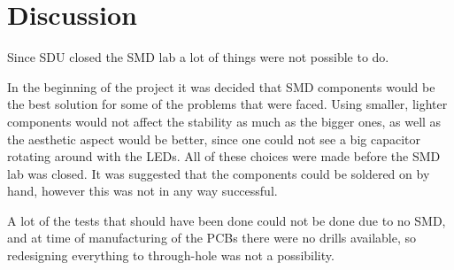 \section{Discussion}

Since SDU closed the SMD lab a lot of things were not possible to do.

In the beginning of the project it was decided that SMD components would be the best solution for some of the problems that were faced.
Using smaller, lighter components would not affect the stability as much as the bigger ones, as well as the aesthetic aspect would be better, since one could not see a big capacitor rotating around with the LEDs.
All of these choices were made before the SMD lab was closed.
It was suggested that the components could be soldered on by hand, however this was not in any way successful. 

A lot of the tests that should have been done could not be done due to no SMD, and at time of manufacturing of the PCBs there were no drills available, so redesigning everything to through-hole was not a possibility. 
